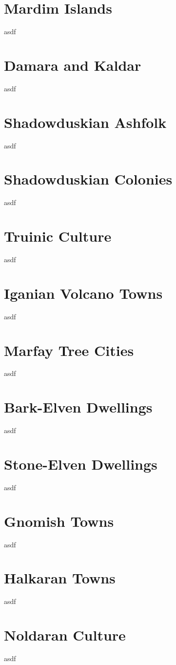 \section{Mardim Islands}
asdf

\section{Damara and Kaldar}
asdf

\section{Shadowduskian Ashfolk}
asdf

\section{Shadowduskian Colonies}
asdf

\section{Truinic Culture} %
asdf

\section{Iganian Volcano Towns}
asdf

\section{Marfay Tree Cities}
asdf

\section{Bark-Elven Dwellings}
asdf

\section{Stone-Elven Dwellings}
asdf

\section{Gnomish Towns}
asdf

\section{Halkaran Towns}
asdf

\section{Noldaran Culture}
asdf

